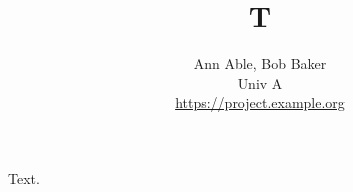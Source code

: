 \documentclass{article}
\title{T}
\author{Ann Able, Bob Baker \\ Univ A \\ {\small \url{https://project.example.org}}}
\begin{document}
\maketitle
Text.
\end{document}
